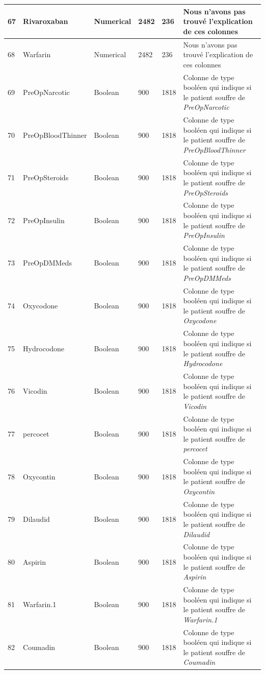 \documentclass[12pt, french]{report}
\begin{document}
\begin{longtable}{| p{} | p{} | p{} | p{}  | p{} | p{} |  }
67 &	Rivaroxaban & Numerical & 2482 & 236 & Nous n’avons pas trouvé l’explication de ces colonnes \\ \hline 
68 &	Warfarin & Numerical & 2482 & 236 & Nous n’avons pas trouvé l’explication de ces colonnes \\ \hline 
69 &	PreOpNarcotic & Boolean & 900 & 1818& Colonne de type booléen qui indique si le patient souffre  de \textit{PreOpNarcotic} \\ \hline 
70 &	PreOpBloodThinner & Boolean & 900 & 1818& Colonne de type booléen qui indique si le patient souffre  de \textit{PreOpBloodThinner} \\ \hline 
71 &	PreOpSteroids & Boolean & 900 & 1818& Colonne de type booléen qui indique si le patient souffre  de \textit{PreOpSteroids} \\ \hline 
72 &	PreOpInsulin & Boolean & 900 & 1818& Colonne de type booléen qui indique si le patient souffre  de \textit{PreOpInsulin} \\ \hline 
73 &	PreOpDMMeds & Boolean & 900 & 1818& Colonne de type booléen qui indique si le patient souffre  de \textit{PreOpDMMeds} \\ \hline 
74 &	Oxycodone & Boolean & 900 & 1818& Colonne de type booléen qui indique si le patient souffre  de \textit{Oxycodone} \\ \hline 
75 &	Hydrocodone & Boolean & 900 & 1818& Colonne de type booléen qui indique si le patient souffre  de \textit{Hydrocodone} \\ \hline 
76 &	Vicodin & Boolean & 900 & 1818& Colonne de type booléen qui indique si le patient souffre  de \textit{Vicodin} \\ \hline 
77 &	percocet & Boolean & 900 & 1818& Colonne de type booléen qui indique si le patient souffre  de \textit{percocet} \\ \hline 
78 &	Oxycontin & Boolean & 900 & 1818& Colonne de type booléen qui indique si le patient souffre  de \textit{Oxycontin} \\ \hline 
79 &	Dilaudid & Boolean & 900 & 1818& Colonne de type booléen qui indique si le patient souffre  de \textit{Dilaudid} \\ \hline 
80 &	Aspirin & Boolean & 900 & 1818& Colonne de type booléen qui indique si le patient souffre  de \textit{Aspirin} \\ \hline 
81 &	Warfarin.1 & Boolean & 900 & 1818& Colonne de type booléen qui indique si le patient souffre  de \textit{Warfarin.1} \\ \hline 
82 &	Coumadin & Boolean & 900 & 1818& Colonne de type booléen qui indique si le patient souffre  de \textit{Coumadin} \\ \hline 

\end{longtable}
\end{document}
